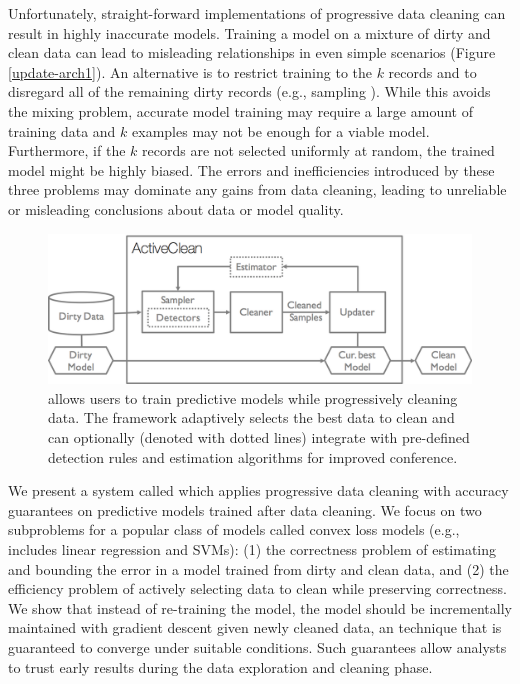 Unfortunately, straight-forward implementations of progressive data cleaning can result in highly inaccurate models.
Training a model on a mixture of dirty and clean data can lead to misleading relationships in even simple scenarios (Figure \ref{update-arch1}).
An alternative is to restrict training to the $k$ records and to disregard all of the remaining dirty records (e.g., sampling \cite{wang1999sample}).
While this avoids the mixing problem, accurate model training may require a large amount of training data and $k$ examples may not be enough for a viable model.
Furthermore, if the $k$ records are not selected uniformly at random, the trained model might be highly biased.
The errors and inefficiencies introduced by these three problems may dominate any gains from data cleaning, leading to unreliable or misleading conclusions about data or model quality.

\begin{figure}[t]
\centering
 \includegraphics[width=\columnwidth]{figs/arch.png}
 \caption{\sysfull allows users to train predictive models while progressively cleaning data. The framework adaptively selects the best data to clean and can optionally (denoted with dotted lines) integrate with pre-defined detection rules and estimation algorithms for improved conference. \label{sys-arch}}\vspace{-2em}
\end{figure}

We present a system called \sys which applies progressive data cleaning with accuracy guarantees on predictive models trained after data cleaning.
We focus on two subproblems for a popular class of models called convex loss models (e.g., includes linear regression and SVMs): (1) the correctness problem of estimating and bounding the error in a model trained from dirty and clean data, and (2) the efficiency problem of actively selecting data to clean while preserving correctness.
We show that instead of re-training the model, the model should be incrementally maintained with gradient descent given newly cleaned data, an technique that is guaranteed to converge under suitable conditions.
Such guarantees allow analysts to trust early results during the data exploration and cleaning phase.

